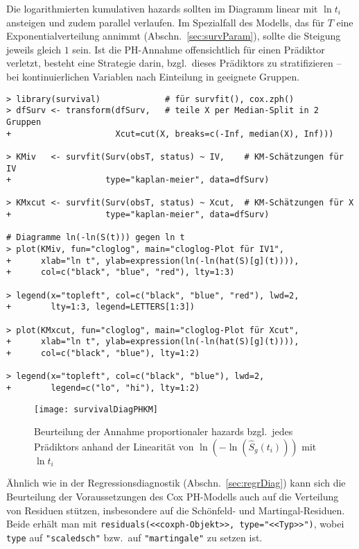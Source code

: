 Die logarithmierten kumulativen hazards sollten im Diagramm linear mit $\ln t_{i}$ ansteigen und zudem parallel verlaufen. Im Spezialfall des Modells, das für $T$ eine Exponentialverteilung annimmt (Abschn.\ \ref{sec:survParam}), sollte die Steigung jeweils gleich $1$ sein. Ist die PH-Annahme offensichtlich für einen Prädiktor verletzt, besteht eine Strategie darin, bzgl.\ dieses Prädiktors zu stratifizieren -- bei kontinuierlichen Variablen nach Einteilung in geeignete Gruppen.
\begin{lstlisting}
> library(survival)             # für survfit(), cox.zph()
> dfSurv <- transform(dfSurv,   # teile X per Median-Split in 2 Gruppen
+                     Xcut=cut(X, breaks=c(-Inf, median(X), Inf)))

> KMiv   <- survfit(Surv(obsT, status) ~ IV,    # KM-Schätzungen für IV
+                   type="kaplan-meier", data=dfSurv)

> KMxcut <- survfit(Surv(obsT, status) ~ Xcut,  # KM-Schätzungen für X
+                   type="kaplan-meier", data=dfSurv)

# Diagramme ln(-ln(S(t))) gegen ln t
> plot(KMiv, fun="cloglog", main="cloglog-Plot für IV1",
+      xlab="ln t", ylab=expression(ln(-ln(hat(S)[g](t)))),
+      col=c("black", "blue", "red"), lty=1:3)

> legend(x="topleft", col=c("black", "blue", "red"), lwd=2,
+        lty=1:3, legend=LETTERS[1:3])

> plot(KMxcut, fun="cloglog", main="cloglog-Plot für Xcut",
+      xlab="ln t", ylab=expression(ln(-ln(hat(S)[g](t)))),
+      col=c("black", "blue"), lty=1:2)

> legend(x="topleft", col=c("black", "blue"), lwd=2,
+        legend=c("lo", "hi"), lty=1:2)
\end{lstlisting}

\begin{figure}[ht]
\centering
\texttt{[image: survivalDiagPHKM]}
\vspace*{-1em}
\caption{Beurteilung der Annahme proportionaler hazards bzgl.\ jedes Prädiktors anhand der Linearität von $\ln(-\ln(\hat{S}_{g}(t_{i})))$ mit $\ln t_{i}$}
\label{fig:survivalDiagPHKM}
\end{figure}

Ähnlich wie in der Regressionsdiagnostik (Abschn.\ \ref{sec:regrDiag}) kann sich die Beurteilung der Voraussetzungen des Cox PH-Modells auch auf die Verteilung von Residuen stützen, insbesondere auf die Schönfeld- und Martingal-Residuen. Beide erhält man mit \lstinline!residuals(<<coxph-Objekt>>, type="<<Typ>>")!, wobei \lstinline!type! auf \lstinline!"scaledsch"! bzw.\ auf \lstinline!"martingale"! zu setzen ist.


